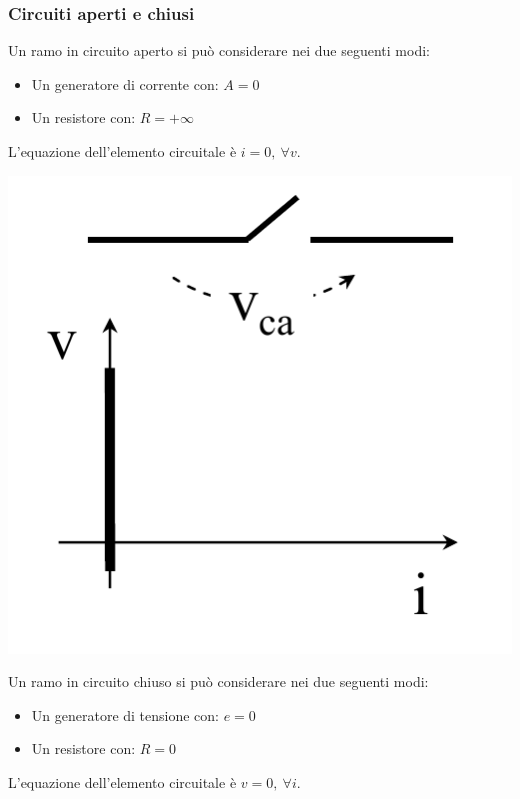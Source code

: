 \documentclass{article}
\begin{document}
\subsubsection{Circuiti aperti e chiusi}
Un ramo in circuito aperto si può
considerare nei due seguenti modi:
\begin{itemize}
    \item Un generatore di corrente con: $A = 0$
    \item Un resistore con: $R = + \infty$
\end{itemize}
L'equazione dell'elemento circuitale è $i=0, \ \forall v$.
\begin{center}
    \includegraphics[scale=0.35]{Image/Circuito aperto.png}
\end{center}
Un ramo in circuito chiuso si può
considerare nei due seguenti modi:
\begin{itemize}
    \item Un generatore di tensione con: $e = 0$
    \item Un resistore con: $R = 0$
\end{itemize}
L'equazione dell'elemento circuitale è $v=0, \ \forall i$.
\end{document}
